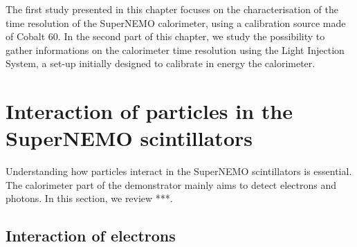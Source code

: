The first study presented in this chapter focuses on the characterisation of the time resolution of the SuperNEMO calorimeter, using a calibration source made of Cobalt $60$.
In the second part of this chapter, we study the possibility to gather informations on the calorimeter time resolution using the Light Injection System, a set-up initially designed to calibrate in energy the calorimeter.

\section{Interaction of particles in the SuperNEMO scintillators}
\label{sec:scintillator_interactions}

Understanding how particles interact in the SuperNEMO scintillators is essential.
The calorimeter part of the demonstrator mainly aims to detect electrons and photons.
In this section, we review ***.


\subsection{Interaction of electrons}

